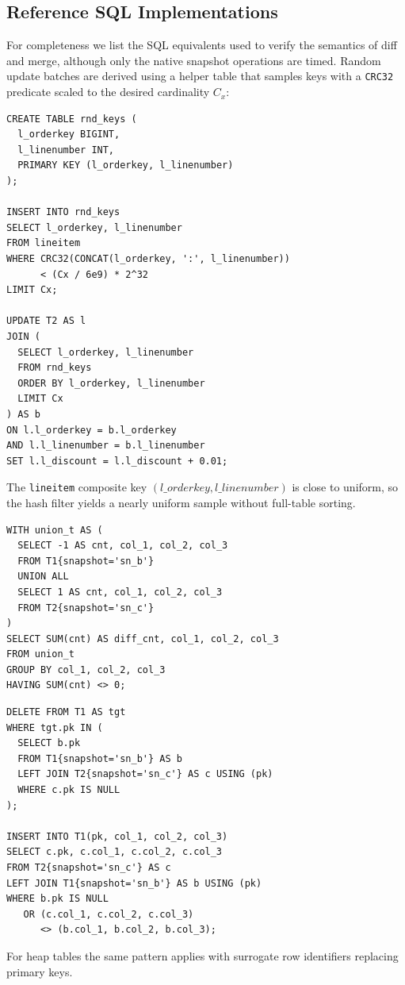 \documentclass[sigconf,nonacm]{acmart} %
\begin{document}
\subsection{Reference SQL Implementations}
For completeness we list the SQL equivalents used to verify the
semantics of diff and merge, although only the native snapshot
operations are timed.  Random update batches are derived using a helper
table that samples keys with a \texttt{CRC32} predicate scaled to the
desired cardinality $C_x$:
\begin{lstlisting}[label=lst:random-keys,caption=Sampling Keys for Update Batches]
CREATE TABLE rnd_keys (
  l_orderkey BIGINT,
  l_linenumber INT,
  PRIMARY KEY (l_orderkey, l_linenumber)
);

INSERT INTO rnd_keys
SELECT l_orderkey, l_linenumber
FROM lineitem
WHERE CRC32(CONCAT(l_orderkey, ':', l_linenumber))
      < (Cx / 6e9) * 2^32
LIMIT Cx;

UPDATE T2 AS l
JOIN (
  SELECT l_orderkey, l_linenumber
  FROM rnd_keys
  ORDER BY l_orderkey, l_linenumber
  LIMIT Cx
) AS b
ON l.l_orderkey = b.l_orderkey
AND l.l_linenumber = b.l_linenumber
SET l.l_discount = l.l_discount + 0.01;
\end{lstlisting}
The \texttt{lineitem} composite key $(l\_orderkey,l\_linenumber)$ is
close to uniform, so the hash filter yields a nearly uniform sample
without full-table sorting.
\begin{lstlisting}[label=lst:diff-sql,caption=SQL Reference for Diff]
WITH union_t AS (
  SELECT -1 AS cnt, col_1, col_2, col_3
  FROM T1{snapshot='sn_b'}
  UNION ALL
  SELECT 1 AS cnt, col_1, col_2, col_3
  FROM T2{snapshot='sn_c'}
)
SELECT SUM(cnt) AS diff_cnt, col_1, col_2, col_3
FROM union_t
GROUP BY col_1, col_2, col_3
HAVING SUM(cnt) <> 0;
\end{lstlisting}
\begin{lstlisting}[label=lst:merge-sql,caption=SQL Reference for Merge]
DELETE FROM T1 AS tgt
WHERE tgt.pk IN (
  SELECT b.pk
  FROM T1{snapshot='sn_b'} AS b
  LEFT JOIN T2{snapshot='sn_c'} AS c USING (pk)
  WHERE c.pk IS NULL
);

INSERT INTO T1(pk, col_1, col_2, col_3)
SELECT c.pk, c.col_1, c.col_2, c.col_3
FROM T2{snapshot='sn_c'} AS c
LEFT JOIN T1{snapshot='sn_b'} AS b USING (pk)
WHERE b.pk IS NULL
   OR (c.col_1, c.col_2, c.col_3)
      <> (b.col_1, b.col_2, b.col_3);
\end{lstlisting}
For heap tables the same pattern applies with surrogate row identifiers
replacing primary keys.
\end{document}
